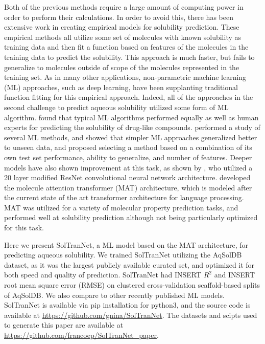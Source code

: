 \documentclass[journal=jmcmar,manuscript=article]{achemso}
\begin{document}
Both of the previous methods require a large amount of computing power in order to perform their calculations.
In order to avoid this, there has been extensive work in creating empirical models for solubility prediction\cite{solrev1,solrev2}.
These empirical methods all utilize some set of molecules with known solubility as training data and then fit a function based on features of the molecules in the training data to predict the solubility.
This approach is much faster, but fails to generalize to molecules outside of scope of the molecules represented in the training set.
As in many other applications, non-parametric machine learning (ML) approaches, such as deep learning, have been supplanting traditional function fitting for this empirical approach.
Indeed, all of the approaches in the second challenge to predict aqueous solubility utilized some form of ML algorithm.\cite{llinas}
\citet{boobier} found that typical ML algorithms performed equally as well as human experts for predicting the solubility of drug-like compounds.
\citet{lovric} performed a study of several ML methods, and showed that simpler ML approaches generalized better to unseen data, and proposed selecting a method based on a combination of its own test set performance, ability to generalize, and number of features.
Deeper models have also shown improvement at this task, as shown by \citet{cui}, who utilized a 20 layer modified ResNet convolutional neural network architecture.
\citet{MAT} developed the molecule attention transformer (MAT) architecture, which is modeled after the current state of the art transformer architecture for language processing.
MAT was utilized for a variety of molecular property prediction tasks, and performed well at solubility prediction although not being particularly optimized for this task.

Here we present SolTranNet, a ML model based on the MAT architecture, for predicting aqueous solubility.
We trained SolTranNet utilizing the AqSolDB dataset\cite{AqSol}, as it was the largest publicly available curated set, and optimized it for both speed and quality of prediction.
SolTranNet had INSERT $R^2$ and INSERT root mean square error (RMSE) on clustered cross-validation scaffold-based splits of AqSolDB.
We also compare to other recently published ML models.\cite{lovric,cui,boobier,llinas}
SolTranNet is available via pip installation for python3, and the source code is available at \url{https://github.com/gnina/SolTranNet}. The datasets and scipts used to generate this paper are available at \url{https://github.com/francoep/SolTranNet_paper}.
\end{document}
